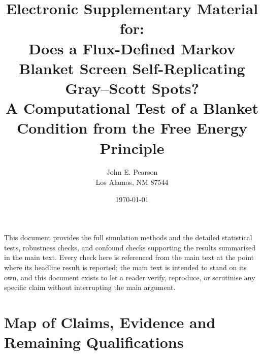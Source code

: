 \documentclass[11pt]{article}
\title{Electronic Supplementary Material for:\\[4pt]
\large Does a Flux-Defined Markov Blanket Screen Self-Replicating Gray--Scott Spots?\\
A Computational Test of a Blanket Condition from the Free Energy Principle}
\author{John E. Pearson\\
Los Alamos, NM 87544}
\date{\today}
\begin{document}
\maketitle

\noindent This document provides the full simulation methods and the detailed
statistical tests, robustness checks, and confound checks supporting the
results summarised in the main text. Every check here is referenced from the
main text at the point where its headline result is reported; the main text
is intended to stand on its own, and this document exists to let a reader
verify, reproduce, or scrutinise any specific claim without interrupting the
main argument.

\tableofcontents

\section*{Map of Claims, Evidence and Remaining Qualifications}
\label{sec:S_claimsmap}
\end{document}
